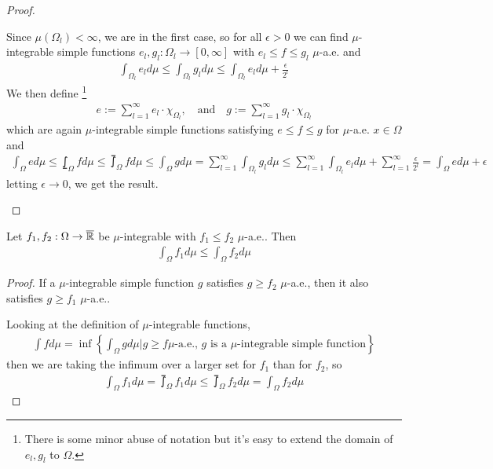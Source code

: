 \begin{proof}
\begin{itemize}
      Since $\mu(\Omega_l) < \infty$, we are in the first case, so for all $\epsilon > 0 $ we can find $\mu$-integrable simple functions $e_l,g_l: \Omega_l \to [0,\infty]$ with $e_l \leq f \leq g_l$ $\mu$-a.e. and
      \begin{align*}
        \int_{\Omega_l} e_l d \mu 
        \leq 
        \int_{\Omega_l} g_l d \mu 
        \leq
        \int_{\Omega_l} e_l d \mu + \frac{\epsilon}{2^{l}}
      \end{align*}
      We then define
      \footnote{There is some minor abuse of notation but it's easy to extend the domain of $e_l,g_l$ to $\Omega$.}
      \begin{align*}
        e := \sum_{l=1}^{\infty} e_l \cdot \chi_{\Omega_l}, 
        \quad \text{and} \quad 
        g := \sum_{l=1}^{\infty} g_l \cdot \chi_{\Omega_l}
      \end{align*}
      which are again $\mu$-integrable simple functions satisfying $e \leq f \leq g$ for $\mu$-a.e. $x \in \Omega$ and
      \begin{align*}
        \int_{\Omega}e d \mu 
        \leq 
        \lowint_{\Omega}f d \mu 
        \leq 
        \upint_{\Omega}f d \mu
        \leq
        \int_{\Omega}g d \mu 
        = 
        \sum_{l=1}^{\infty} \int_{\Omega_l}g_l d \mu 
        \leq 
        \sum_{l=1}^{\infty} \int_{\Omega_l} e_l d \mu + \sum_{l=1}^{\infty} \frac{\epsilon}{2^{l}}
        = \int_{\Omega}e d \mu + \epsilon
      \end{align*}
      letting $\epsilon \to  0$, we get the result.
  \end{itemize}
\end{proof}




\begin{prop}[Monotonicity]
  Let $f_1,f_2: \Omega \to \overline{\mathbb{R}}$ be $\mu$-integrable with $f_1 \leq f_2$ $\mu$-a.e.. Then
  \begin{align*}
    \int_{\Omega} f_1 d \mu \leq \int_{\Omega} f_2 d \mu
  \end{align*}
\end{prop}
\begin{proof}
  If a $\mu$-integrable simple function $g$ satisfies $g \geq f_2$ $\mu$-a.e., then it also satisfies $g \geq f_1$ $\mu$-a.e..

  Looking at the definition of $\mu$-integrable functions, 
  \begin{align*}
    \int f d \mu = 
      \inf \left\{
        \int_{\Omega}g d \mu
        \big\vert g \geq f \mu\text{-a.e., $g$ is a $\mu$-integrable simple function}
      \right\}
  \end{align*}
  then we are taking the infimum over a larger set for $f_1$ than for $f_2$, so 
  \begin{align*}
    \int_{\Omega}f_1 d \mu 
    =
    \upint_{\Omega}f_1 d \mu
    \leq
    \upint_{\Omega}f_2 d \mu
    = \int_{\Omega}f_2 d \mu
  \end{align*}
\end{proof}

